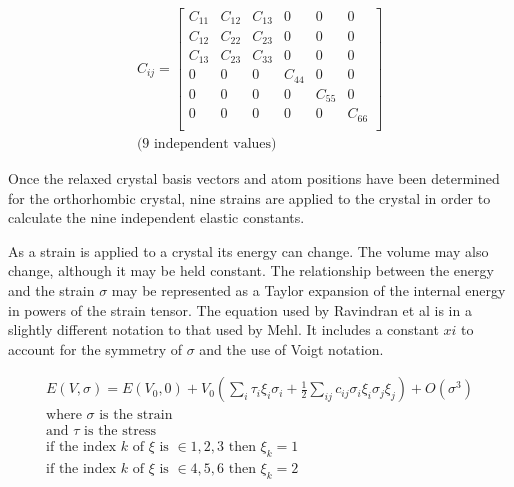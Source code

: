 \begin{equation}
    \begin{split}
      C_{ij} = 
      \begin{bmatrix}
      C_{11} & C_{12} & C_{13} & 0      & 0      & 0      \\
      C_{12} & C_{22} & C_{23} & 0      & 0      & 0      \\
      C_{13} & C_{23} & C_{33} & 0      & 0      & 0      \\
      0      & 0      & 0      & C_{44} & 0      & 0      \\
      0      & 0      & 0      & 0      & C_{55} & 0      \\
      0      & 0      & 0      & 0      & 0      & C_{66} \\
      \end{bmatrix}\\
      \text{(9 independent values)}
    \end{split}
    \label{eq:eqOrthoRhombicEC}
\end{equation}


Once the relaxed crystal basis vectors and atom positions have been determined for the orthorhombic crystal, nine strains are applied to the crystal \cite{DftTiSiRavindran} in order to calculate the nine independent elastic constants.


\FloatBarrier

As a strain is applied to a crystal its energy can change.  The volume may also change, although it may be held constant.  The relationship between the energy and the strain $\sigma$ may be represented as a Taylor expansion of the internal energy in powers of the strain tensor\cite{DftTiSiRavindran}.  The equation used by Ravindran et al is in a slightly different notation to that used by Mehl\cite{elasticpropertiesmehl}.  It includes a constant $xi$ to account for the symmetry of $\sigma$ and the use of Voigt notation.

\begin{equation}
  \begin{split}
  E(V,\sigma) = E(V_{0},0) + V_{0} \left( \sum_{i} \tau_i \xi_i \sigma_i + \frac{1}{2} \sum_{ij} c_{ij} \sigma_{i} \xi_{i} \sigma_{j} \xi_{j} \right) + O(\sigma^3) \\
\text{where } \sigma \text{ is the strain} \\
\text{and } \tau \text{ is the stress} \\
\text{if the index } k \text{ of } \xi \text{ is } \in {1, 2, 3} \text{ then } \xi_k = 1 \\
\text{if the index } k \text{ of } \xi \text{ is } \in {4, 5, 6} \text{ then } \xi_k = 2 \\
  \end{split}
\end{equation}



